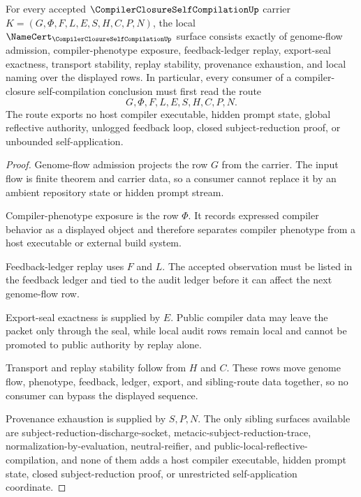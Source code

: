 \begin{theorem}
\label{thm:compiler-closure-self-compilation-namecert-obligations}
For every accepted $\CompilerClosureSelfCompilationUp$ carrier $K=(G,\Phi,F,L,E,S,H,C,P,N)$, the local $\NameCert_{\CompilerClosureSelfCompilationUp}$ surface consists exactly of genome-flow admission, compiler-phenotype exposure, feedback-ledger replay, export-seal exactness, transport stability, replay stability, provenance exhaustion, and local naming over the displayed rows. In particular, every consumer of a compiler-closure self-compilation conclusion must first read the route
$$
G,\Phi,F,L,E,S,H,C,P,N .
$$
The route exports no host compiler executable, hidden prompt state, global reflective authority, unlogged feedback loop, closed subject-reduction proof, or unbounded self-application.
\end{theorem}
\begin{proof}
Genome-flow admission projects the row $G$ from the carrier. The input flow is finite theorem and carrier data, so a consumer cannot replace it by an ambient repository state or hidden prompt stream.

Compiler-phenotype exposure is the row $\Phi$. It records expressed compiler behavior as a displayed object and therefore separates compiler phenotype from a host executable or external build system.

Feedback-ledger replay uses $F$ and $L$. The accepted observation must be listed in the feedback ledger and tied to the audit ledger before it can affect the next genome-flow row.

Export-seal exactness is supplied by $E$. Public compiler data may leave the packet only through the seal, while local audit rows remain local and cannot be promoted to public authority by replay alone.

Transport and replay stability follow from $H$ and $C$. These rows move genome flow, phenotype, feedback, ledger, export, and sibling-route data together, so no consumer can bypass the displayed sequence.

Provenance exhaustion is supplied by $S,P,N$. The only sibling surfaces available are subject-reduction-discharge-socket, metacic-subject-reduction-trace, normalization-by-evaluation, neutral-reifier, and public-local-reflective-compilation, and none of them adds a host compiler executable, hidden prompt state, closed subject-reduction proof, or unrestricted self-application coordinate.
\end{proof}

